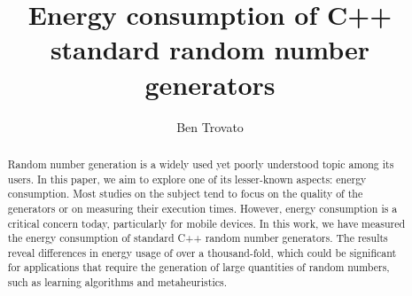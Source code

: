 \documentclass[sigconf]{acmart}
\begin{document}
\title{Energy consumption of C++ standard random number generators}
\subtitle{}

\renewcommand{\shorttitle}{Energy consumption of C++ standard random number generators}

\author{Ben Trovato}

\renewcommand{\shortauthors}{B. Trovato}

\begin{abstract}
Random number generation is a widely used yet poorly understood topic among its users. In this paper, we aim to explore one of its lesser-known aspects: energy consumption. Most studies on the subject tend to focus on the quality of the generators or on measuring their execution times. However, energy consumption is a critical concern today, particularly for mobile devices. In this work, we have measured the energy consumption of standard C++ random number generators. The results reveal differences in energy usage of over a thousand-fold, which could be significant for applications that require the generation of large quantities of random numbers, such as learning algorithms and metaheuristics.
\end{abstract}
\end{document}
